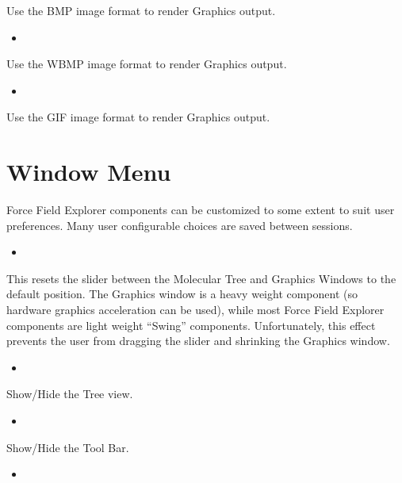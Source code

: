 \documentclass[letterpaper,11pt,english]{sphinxmanual}
\begin{document}
\sphinxAtStartPar
Use the BMP image format to render Graphics output.
\begin{itemize}
\item {} 
\sphinxAtStartPar
{}

\end{itemize}

\sphinxAtStartPar
Use the WBMP image format to render Graphics output.
\begin{itemize}
\item {} 
\sphinxAtStartPar
{}

\end{itemize}

\sphinxAtStartPar
Use the GIF image format to render Graphics output.


\section{Window Menu}
\label{\detokenize{text/menus:window-menu}}
\sphinxAtStartPar
Force Field Explorer components can be customized to some extent to suit user preferences. Many user configurable choices are saved between sessions.
\begin{itemize}
\item {} 
\sphinxAtStartPar
{}

\end{itemize}

\sphinxAtStartPar
This resets the slider between the Molecular Tree and Graphics Windows to the default position. The Graphics window is a heavy weight component (so hardware graphics acceleration can be used), while most Force Field Explorer components are light weight “Swing” components. Unfortunately, this effect prevents the user from dragging the slider and shrinking the Graphics window.
\begin{itemize}
\item {} 
\sphinxAtStartPar
{}

\end{itemize}

\sphinxAtStartPar
Show/Hide the Tree view.
\begin{itemize}
\item {} 
\sphinxAtStartPar
{}

\end{itemize}

\sphinxAtStartPar
Show/Hide the Tool Bar.
\begin{itemize}
\item {} 
\sphinxAtStartPar
{}

\end{itemize}
\end{document}
